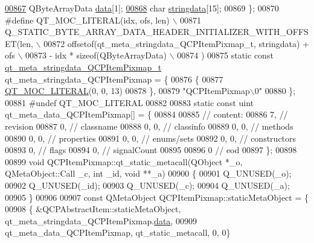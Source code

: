 \begin{DoxyCode}
\hypertarget{a00016_source_l00867}{}\hyperlink{a00016_ac2c2965eddf58c85d34bd6a8bc3608fe}{00867}     QByteArrayData \hyperlink{a00016_ac2c2965eddf58c85d34bd6a8bc3608fe}{data}[1];
\hypertarget{a00016_source_l00868}{}\hyperlink{a00016_a4cee80f7af4fafbb06fc161890ced10e}{00868}     \textcolor{keywordtype}{char} \hyperlink{a00016_a4cee80f7af4fafbb06fc161890ced10e}{stringdata}[15];
00869 \};
00870 \textcolor{preprocessor}{#define QT\_MOC\_LITERAL(idx, ofs, len) \(\backslash\)}
00871 \textcolor{preprocessor}{    Q\_STATIC\_BYTE\_ARRAY\_DATA\_HEADER\_INITIALIZER\_WITH\_OFFSET(len, \(\backslash\)}
00872 \textcolor{preprocessor}{    offsetof(qt\_meta\_stringdata\_QCPItemPixmap\_t, stringdata) + ofs \(\backslash\)}
00873 \textcolor{preprocessor}{        - idx * sizeof(QByteArrayData) \(\backslash\)}
00874 \textcolor{preprocessor}{    )}
00875 \textcolor{keyword}{static} \textcolor{keyword}{const} \hyperlink{a00016_dd/d42/a00109}{qt\_meta\_stringdata\_QCPItemPixmap\_t} 
      qt\_meta\_stringdata\_QCPItemPixmap = \{
00876     \{
00877 \hyperlink{a00016_a75bb9482d242cde0a06c9dbdc6b83abe}{QT\_MOC\_LITERAL}(0, 0, 13)
00878     \},
00879     \textcolor{stringliteral}{"QCPItemPixmap\(\backslash\)0"}
00880 \};
00881 \textcolor{preprocessor}{#undef QT\_MOC\_LITERAL}
00882 
00883 \textcolor{keyword}{static} \textcolor{keyword}{const} uint qt\_meta\_data\_QCPItemPixmap[] = \{
00884 
00885  \textcolor{comment}{// content:}
00886        7,       \textcolor{comment}{// revision}
00887        0,       \textcolor{comment}{// classname}
00888        0,    0, \textcolor{comment}{// classinfo}
00889        0,    0, \textcolor{comment}{// methods}
00890        0,    0, \textcolor{comment}{// properties}
00891        0,    0, \textcolor{comment}{// enums/sets}
00892        0,    0, \textcolor{comment}{// constructors}
00893        0,       \textcolor{comment}{// flags}
00894        0,       \textcolor{comment}{// signalCount}
00895 
00896        0        \textcolor{comment}{// eod}
00897 \};
00898 
00899 \textcolor{keywordtype}{void} QCPItemPixmap::qt\_static\_metacall(QObject *\_o, QMetaObject::Call \_c, \textcolor{keywordtype}{int} \_id, \textcolor{keywordtype}{void} **\_a)
00900 \{
00901     Q\_UNUSED(\_o);
00902     Q\_UNUSED(\_id);
00903     Q\_UNUSED(\_c);
00904     Q\_UNUSED(\_a);
00905 \}
00906 
00907 \textcolor{keyword}{const} QMetaObject QCPItemPixmap::staticMetaObject = \{
00908     \{ &QCPAbstractItem::staticMetaObject, qt\_meta\_stringdata\_QCPItemPixmap.\hyperlink{a00016_ac2c2965eddf58c85d34bd6a8bc3608fe}{data},
00909       qt\_meta\_data\_QCPItemPixmap,  qt\_static\_metacall, 0, 0\}

\end{DoxyCode}
